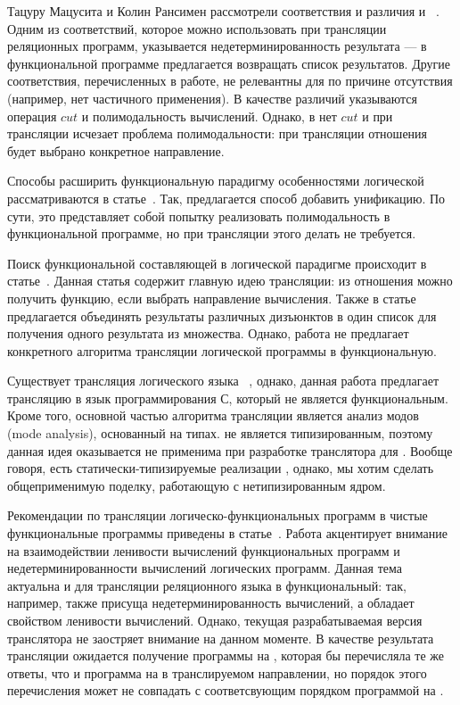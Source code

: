 Тацуру Мацусита и Колин Рансимен рассмотрели соответствия и различия \prolog{} и \haskell{}~\cite{Matsushita1997FCO}.
Одним из соответствий, которое можно использовать при трансляции реляционных программ, указывается недетерминированность результата --- в функциональной программе предлагается возвращать список результатов.
Другие соответствия, перечисленных в работе, не релевантны для \miniKanren{} по причине отсутствия (например, нет частичного применения).
В качестве различий указываются операция $cut$ и полимодальность вычислений.
Однако, в \miniKanren{} нет $cut$ и при трансляции исчезает проблема полимодальности: при трансляции отношения будет выбрано конкретное направление.

Способы расширить функциональную парадигму особенностями логической рассматриваются в статье~\cite{Bellia1986TRB}.
Так, предлагается способ добавить унификацию.
По сути, это представляет собой попытку реализовать полимодальность в функциональной программе, но при трансляции этого делать не требуется.

Поиск функциональной составляющей в логической парадигме происходит в статье~\cite{Marchiori1995the}.
Данная статья содержит главную идею трансляции: из отношения можно получить функцию, если выбрать направление вычисления.
Также в статье предлагается объединять результаты различных дизъюнктов в один список для получения одного результата из множества.
Однако, работа не предлагает конкретного алгоритма трансляции логической программы в функциональную.

Существует трансляция логического языка \mercury{}~\cite{SOMOGYI199617}, однако, данная работа предлагает трансляцию в язык программирования С, который не является функциональным.
Кроме того, основной частью алгоритма трансляции является анализ модов (mode analysis), основанный на типах.
\miniKanren{} не является типизированным, поэтому данная идея оказывается не применима при разработке транслятора для \miniKanren{}.
Вообще говоря, есть статически-типизируемые реализации \miniKanren{}, однако, мы хотим сделать общеприменимую поделку, работающую с нетипизированным ядром.

Рекомендации по трансляции логическо-функциональных программ в чистые функциональные программы приведены в статье~\cite{Brassel2008FFL}.
Работа акцентирует внимание на взаимодействии ленивости вычислений функциональных программ и недетерминированности вычислений логических программ.
Данная тема актуальна и для трансляции реляционного языка в функциональный: так, например, \miniKanren{} также присуща недетерминированность вычислений, а \haskell{} обладает свойством ленивости вычислений.
Однако, текущая разрабатываемая версия транслятора не заостряет внимание на данном моменте.
В качестве результата трансляции ожидается получение программы на \haskell{}, которая бы перечисляла те же ответы, что и программа на \miniKanren{} в транслируемом направлении, но порядок этого перечисления может не совпадать с соответсвующим порядком программой на \miniKanren{}.

